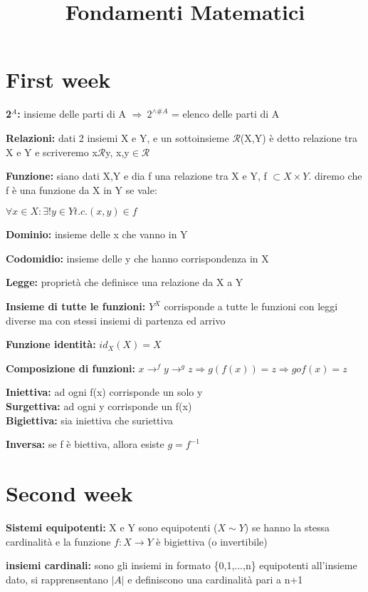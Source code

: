 \documentclass[12pt, a4paper]{article}
\title{Fondamenti Matematici}
\begin{document}
    
\section{First week}
\textbf{2$^{A}$:} insieme delle parti di A $\Rightarrow\ 2^{\wedge\#A}$ = elenco delle parti di A

\textbf{Relazioni:} dati 2 insiemi X e Y, e un sottoinsieme $\mathcal{R}$(X,Y) è detto relazione tra 
X e Y e scriveremo x$\mathcal{R}$y, x,y$\in\mathcal{R}$

\textbf{Funzione:} siano dati X,Y e dia f una relazione tra X e Y, f $\subset X\times Y$.
diremo che f è una funzione da X in Y se vale:
\begin{center}
    $\forall x \in X: \exists ! y \in Y t.c. (x,y)\in f$
\end{center}

\textbf{Dominio:} insieme delle x che vanno in Y

\textbf{Codomidio:} insieme delle y che hanno corrispondenza in X

\textbf{Legge:} proprietà che definisce una relazione da X a Y

\textbf{Insieme di tutte le funzioni:} $Y^{X}$ corrisponde a tutte le funzioni con leggi diverse ma
con stessi insiemi di partenza ed arrivo

\textbf{Funzione identità:} $id_{X}(X) = X$

\textbf{Composizione di funzioni:} $x\rightarrow^{f} y\rightarrow^{g} z \Rightarrow g(f(x)) = z
\Rightarrow gof(x) = z$ 

\textbf{Iniettiva:} ad ogni f(x) corrisponde un solo y\\
\textbf{Surgettiva:} ad ogni y corrisponde un f(x)\\
\textbf{Bigiettiva:} sia iniettiva che suriettiva

\textbf{Inversa:} se f è biettiva, allora esiste $g=f^{-1}$

\newpage
\section{Second week}

\textbf{Sistemi equipotenti:} X e Y sono equipotenti ($X\sim Y$) se hanno la stessa
cardinalità e la funzione $f:X\rightarrow Y$ è bigiettiva (o invertibile)

\textbf{insiemi cardinali:} sono gli insiemi in formato \{0,1,...,n\} equipotenti all'insieme dato, si 
rapprensentano $|A|$ e definiscono una cardinalità pari a n+1
\end{document}
